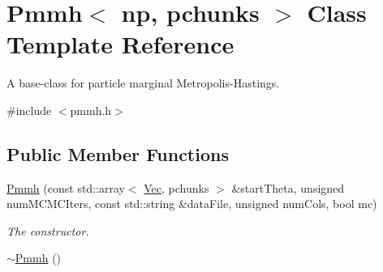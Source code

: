 \hypertarget{classPmmh}{}\section{Pmmh$<$ np, pchunks $>$ Class Template Reference}
\label{classPmmh}


A base-\/class for particle marginal Metropolis-\/\+Hastings.  




{\ttfamily \#include $<$pmmh.\+h$>$}

\subsection*{Public Member Functions}
\begin{DoxyCompactItemize}
\item 
\hyperlink{classPmmh_a14c283402cf7caf2b9e77efdf7ba1371}{Pmmh} (const std\+::array$<$ \hyperlink{apf__filter_8h_a4c7df05c6f5e8a0d15ae14bcdbc07152}{Vec}, pchunks $>$ \&start\+Theta, unsigned num\+M\+C\+M\+C\+Iters, const std\+::string \&data\+File, unsigned num\+Cols, bool mc)
\begin{DoxyCompactList}\small\item\em The constructor. \end{DoxyCompactList}\item 
\hyperlink{classPmmh_ae2c67a65abf01f4eaefc6b56e3bcb952}{$\sim$\+Pmmh} ()\hypertarget{classPmmh_ae2c67a65abf01f4eaefc6b56e3bcb952}{}\label{classPmmh_ae2c67a65abf01f4eaefc6b56e3bcb952}


\end{DoxyCompactItemize}
